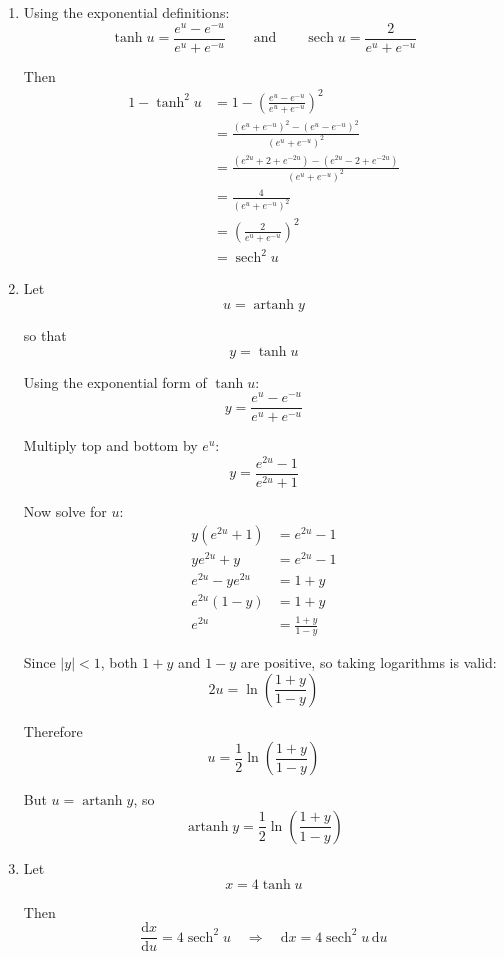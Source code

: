 \documentclass[leqno]{article}
\begin{document}
\begin{enumerate}[
  label=\textbf{\arabic*.},
  leftmargin=*,
  topsep=0pt,
  partopsep=0pt,
  parsep=0pt
]
\vspace*{10pt}

\begin{djsSolution}
\begin{enumerate}[label=\textbf{(\roman*)}]
\item Using the exponential definitions:
\[
\tanh u=\frac{e^u-e^{-u}}{e^u+e^{-u}}
\qquad\text{and}\qquad
\operatorname{sech}u=\frac{2}{e^u+e^{-u}}
\]

Then
\begin{align*}
1-\tanh^2u
&=1-\left(\frac{e^u-e^{-u}}{e^u+e^{-u}}\right)^2 \\
&=\frac{(e^u+e^{-u})^2-(e^u-e^{-u})^2}{(e^u+e^{-u})^2} \\
&=\frac{(e^{2u}+2+e^{-2u})-(e^{2u}-2+e^{-2u})}{(e^u+e^{-u})^2} \\
&=\frac{4}{(e^u+e^{-u})^2} \\
&=\left(\frac{2}{e^u+e^{-u}}\right)^2 \\
&=\operatorname{sech}^2u
\end{align*}

\item Let
\[
u=\operatorname{artanh}y
\]

so that
\[
y=\tanh u
\]

Using the exponential form of $\tanh u$:
\[
y=\frac{e^u-e^{-u}}{e^u+e^{-u}}
\]

Multiply top and bottom by $e^u$:
\[
y=\frac{e^{2u}-1}{e^{2u}+1}
\]

Now solve for $u$:
\begin{align*}
y(e^{2u}+1)&=e^{2u}-1 \\
ye^{2u}+y&=e^{2u}-1 \\
e^{2u}-ye^{2u}&=1+y \\
e^{2u}(1-y)&=1+y \\
e^{2u}&=\frac{1+y}{1-y}
\end{align*}

Since $|y|<1$, both $1+y$ and $1-y$ are positive, so taking logarithms is valid:
\[
2u=\ln\left(\frac{1+y}{1-y}\right)
\]

Therefore
\[
u=\frac12\ln\left(\frac{1+y}{1-y}\right)
\]

But $u=\operatorname{artanh}y$, so
\[
\operatorname{artanh}y=\frac12\ln\left(\frac{1+y}{1-y}\right)
\]

\item Let
\[
x=4\tanh u
\]

Then
\[
\frac{\mathrm{d}x}{\mathrm{d}u}=4\operatorname{sech}^2u
\quad\Longrightarrow\quad
\mathrm{d}x=4\operatorname{sech}^2u\,\mathrm{d}u
\]


\end{enumerate}
\end{djsSolution}
\end{enumerate}
\end{document}
